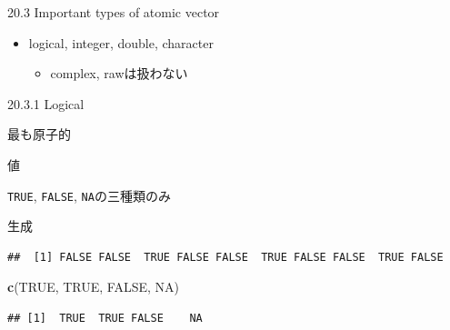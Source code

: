 \documentclass[ignorenonframetext,]{beamer}
\newenvironment{Shaded}{\begin{snugshade}}{\end{snugshade}}
\newcommand{\KeywordTok}[1]{\textcolor[rgb]{0.13,0.29,0.53}{\textbf{#1}}}
\newcommand{\DecValTok}[1]{\textcolor[rgb]{0.00,0.00,0.81}{#1}}
\newcommand{\StringTok}[1]{\textcolor[rgb]{0.31,0.60,0.02}{#1}}
\newcommand{\OtherTok}[1]{\textcolor[rgb]{0.56,0.35,0.01}{#1}}
\newcommand{\OperatorTok}[1]{\textcolor[rgb]{0.81,0.36,0.00}{\textbf{#1}}}
\newcommand{\NormalTok}[1]{#1}
\providecommand{\tightlist}{%
  \setlength{\itemsep}{0pt}\setlength{\parskip}{0pt}}
\begin{document}
\begin{frame}{20.3 Important types of atomic vector}

\begin{itemize}
\tightlist
\item
  logical, integer, double, character

  \begin{itemize}
  \tightlist
  \item
    complex, rawは扱わない
  \end{itemize}
\end{itemize}

\end{frame}

\begin{frame}[fragile]{20.3.1 Logical}

最も原子的

\begin{block}{値}

\texttt{TRUE}, \texttt{FALSE}, \texttt{NA}の三種類のみ

\end{block}

\begin{block}{生成}

\begin{Shaded}
\end{Shaded}

\begin{verbatim}
##  [1] FALSE FALSE  TRUE FALSE FALSE  TRUE FALSE FALSE  TRUE FALSE
\end{verbatim}

\begin{Shaded}
\begin{Highlighting}[]
\KeywordTok{c}\NormalTok{(}\OtherTok{TRUE}\NormalTok{, }\OtherTok{TRUE}\NormalTok{, }\OtherTok{FALSE}\NormalTok{, }\OtherTok{NA}\NormalTok{)}
\end{Highlighting}
\end{Shaded}

\begin{verbatim}
## [1]  TRUE  TRUE FALSE    NA
\end{verbatim}

\end{block}

\end{frame}
\end{document}
